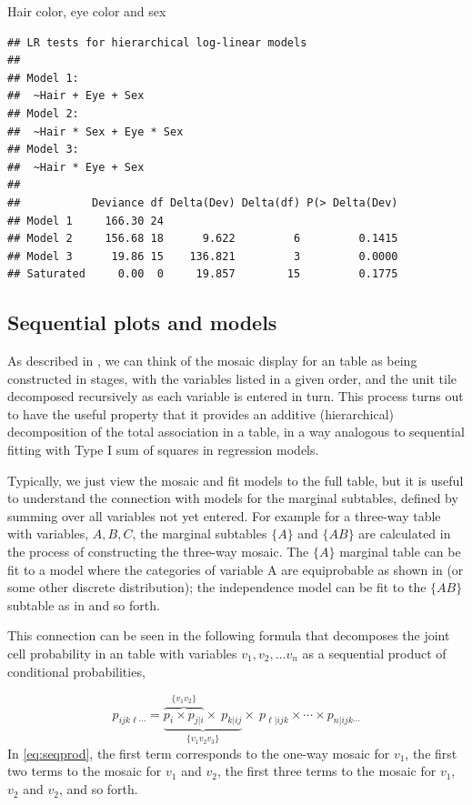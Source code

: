 \documentclass[11pt]{book}
\renewenvironment{knitrout}{\small\renewcommand{\baselinestretch}{.85}}{} %
\begin{document}
\begin{Example}[HEC2]{Hair color, eye color and sex}
\begin{knitrout}
\begin{kframe}
\begin{verbatim}
## LR tests for hierarchical log-linear models
## 
## Model 1:
##  ~Hair + Eye + Sex 
## Model 2:
##  ~Hair * Sex + Eye * Sex 
## Model 3:
##  ~Hair * Eye + Sex 
## 
##           Deviance df Delta(Dev) Delta(df) P(> Delta(Dev)
## Model 1     166.30 24                                    
## Model 2     156.68 18      9.622         6         0.1415
## Model 3      19.86 15    136.821         3         0.0000
## Saturated     0.00  0     19.857        15         0.1775
\end{verbatim}
\end{kframe}
\end{knitrout}

\end{Example}

\subsection{Sequential plots and models}\label{sec:mosaic-seq}

As described in ,
we can think of the mosaic display for an \nway table as being constructed in stages,
with the variables listed in a given order, and the unit tile decomposed recursively
as each variable is entered in turn.  This process turns out to have the useful property
that it provides an additive (hierarchical) decomposition of the total association in a table,
in a way analogous to sequential fitting with Type I sum of squares in regression models.

Typically, we just view the mosaic and fit models to the full \nway table, but it is
useful to understand the connection with models for the marginal subtables,
defined by summing over all variables not yet entered.
For example for a three-way table with variables,
$A,B,C$, the marginal subtables $\{A\}$ and $\{AB\}$
are calculated
in the process of constructing the three-way mosaic.
The $\{A\}$ marginal table can be fit to a model where the categories
of variable A are equiprobable as shown in 
(or some other discrete distribution);
the independence model can be fit to the $\{AB\}$ subtable as in 
and so forth.

This connection can be seen in the following formula that decomposes the
joint cell probability in an \nway table with variables $v_1, v_2, \dots v_n$
as a sequential product of conditional
probabilities,

\begin{equation}\label{eq:seqprod}
p_{ijk\ell \cdots} = \underbrace{\overbrace{p_i \times p_{j|i}}^{\{v_1 v_2\}} \times \: p_{k|ij}}_{\{v_1 v_2 v_3\}}
       \times \: p_{\ell|ijk} \times\cdots \times p_{n|ijk\cdots}
\end{equation}
In \eqref{eq:seqprod}, the first term corresponds to the one-way mosaic for $v_1$,
the first two terms to the mosaic for $v_1$ and $v_2$,
the first three terms to the mosaic for $v_1$, $v_2$ and $v_2$, and so forth.
\end{document}
